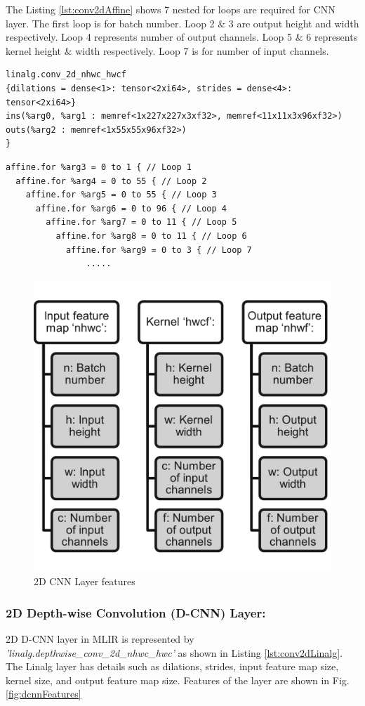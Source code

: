The Listing \ref{lst:conv2dAffine} shows 7 nested for loops are required for CNN layer. The first loop is for batch number. Loop 2 \& 3 are output height and width respectively.  Loop 4 represents number of output channels. Loop 5 \& 6 represents kernel height \& width respectively. Loop 7 is for number of input channels.

\begin{lstlisting}[caption={Example conv2d at Linalg dialect}, label={lst:conv2dLinalg}]
linalg.conv_2d_nhwc_hwcf 
{dilations = dense<1>: tensor<2xi64>, strides = dense<4>: tensor<2xi64>}
ins(%arg0, %arg1 : memref<1x227x227x3xf32>, memref<11x11x3x96xf32>)
outs(%arg2 : memref<1x55x55x96xf32>)
}
\end{lstlisting}

\begin{lstlisting}[caption={Example conv2d at Affine dialect}, label={lst:conv2dAffine}]
affine.for %arg3 = 0 to 1 { // Loop 1
  affine.for %arg4 = 0 to 55 { // Loop 2
    affine.for %arg5 = 0 to 55 { // Loop 3
      affine.for %arg6 = 0 to 96 { // Loop 4
        affine.for %arg7 = 0 to 11 { // Loop 5
          affine.for %arg8 = 0 to 11 { // Loop 6
            affine.for %arg9 = 0 to 3 { // Loop 7
                .....
\end{lstlisting}

\begin{figure}[H]
    \centering
    \includegraphics[width=0.5\linewidth]{figure//chapter3_implementation/Figure 2 - conv2d features.png}
    \caption{2D CNN Layer features}
    \label{fig:cnnFeatures}
\end{figure}

\subsubsection{2D Depth-wise Convolution (D-CNN) Layer:}

2D D-CNN layer in MLIR is represented by \textit{'linalg.depthwise\_conv\_2d\_nhwc\_hwc'} as shown in Listing \ref{lst:conv2dLinalg}. The Linalg layer has details such as dilations, strides, input feature map size, kernel size, and output feature map size. Features of the layer are shown in Fig. \ref{fig:dcnnFeatures}

